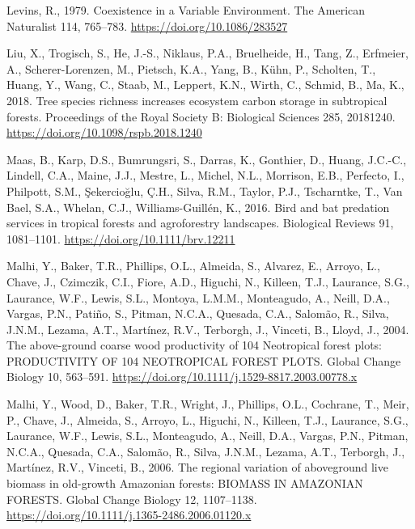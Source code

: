 \documentclass[
  12pt,
]{article}
\newlength{\cslhangindent}
\newlength{\cslentryspacingunit} %
\newenvironment{CSLReferences}[2] %
 {%
  \setlength{\parindent}{0pt}
  \ifodd #1
  \let\oldpar\par
  \def\par{\hangindent=\cslhangindent\oldpar}
  \fi
  \setlength{\parskip}{#2\cslentryspacingunit}
 }%
 {}
\begin{document}
\begin{CSLReferences}{1}{0}
\leavevmode{}%
Levins, R., 1979. Coexistence in a {Variable Environment}. The American Naturalist 114, 765--783. \url{https://doi.org/10.1086/283527}

\leavevmode{}%
Liu, X., Trogisch, S., He, J.-S., Niklaus, P.A., Bruelheide, H., Tang, Z., Erfmeier, A., Scherer-Lorenzen, M., Pietsch, K.A., Yang, B., Kühn, P., Scholten, T., Huang, Y., Wang, C., Staab, M., Leppert, K.N., Wirth, C., Schmid, B., Ma, K., 2018. Tree species richness increases ecosystem carbon storage in subtropical forests. Proceedings of the Royal Society B: Biological Sciences 285, 20181240. \url{https://doi.org/10.1098/rspb.2018.1240}

\leavevmode{}%
Maas, B., Karp, D.S., Bumrungsri, S., Darras, K., Gonthier, D., Huang, J.C.-C., Lindell, C.A., Maine, J.J., Mestre, L., Michel, N.L., Morrison, E.B., Perfecto, I., Philpott, S.M., Şekercioğlu, Ç.H., Silva, R.M., Taylor, P.J., Tscharntke, T., Van Bael, S.A., Whelan, C.J., Williams-Guillén, K., 2016. Bird and bat predation services in tropical forests and agroforestry landscapes. Biological Reviews 91, 1081--1101. \url{https://doi.org/10.1111/brv.12211}

\leavevmode{}%
Malhi, Y., Baker, T.R., Phillips, O.L., Almeida, S., Alvarez, E., Arroyo, L., Chave, J., Czimczik, C.I., Fiore, A.D., Higuchi, N., Killeen, T.J., Laurance, S.G., Laurance, W.F., Lewis, S.L., Montoya, L.M.M., Monteagudo, A., Neill, D.A., Vargas, P.N., Patiño, S., Pitman, N.C.A., Quesada, C.A., Salomão, R., Silva, J.N.M., Lezama, A.T., Martínez, R.V., Terborgh, J., Vinceti, B., Lloyd, J., 2004. The above-ground coarse wood productivity of 104 {Neotropical} forest plots: {PRODUCTIVITY OF} 104 {NEOTROPICAL FOREST PLOTS}. Global Change Biology 10, 563--591. \url{https://doi.org/10.1111/j.1529-8817.2003.00778.x}

\leavevmode{}%
Malhi, Y., Wood, D., Baker, T.R., Wright, J., Phillips, O.L., Cochrane, T., Meir, P., Chave, J., Almeida, S., Arroyo, L., Higuchi, N., Killeen, T.J., Laurance, S.G., Laurance, W.F., Lewis, S.L., Monteagudo, A., Neill, D.A., Vargas, P.N., Pitman, N.C.A., Quesada, C.A., Salomão, R., Silva, J.N.M., Lezama, A.T., Terborgh, J., Martínez, R.V., Vinceti, B., 2006. The regional variation of aboveground live biomass in old-growth {Amazonian} forests: {BIOMASS IN AMAZONIAN FORESTS}. Global Change Biology 12, 1107--1138. \url{https://doi.org/10.1111/j.1365-2486.2006.01120.x}


\end{CSLReferences}
\end{document}
